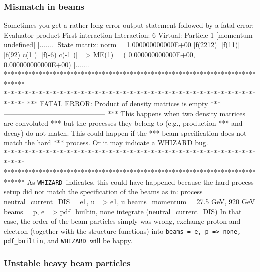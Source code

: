 \documentclass[12pt]{book}
\newenvironment{code}%
  {\begingroup\footnotesize
   \quote
   \Verbatim}%
  {\endVerbatim
   \endquote
   \endgroup\noindent}
\newenvironment{Code}%
  {\begingroup\footnotesize
   \quote
   \Verbatim[frame=single]}%
  {\endVerbatim
   \endquote
   \endgroup\noindent}
\newcommand{\ttt}[1]{\texttt{#1}}
\newcommand{\whizard}{\ttt{WHIZARD}}
\begin{document}
\subsubsection{Mismatch in beams}

Sometimes you get a rather long error output statement followed by a
fatal error:
\begin{Code}
 Evaluator product
 First interaction
 Interaction: 6
 Virtual:
 Particle 1
  [momentum undefined]
[.......]
 State matrix:  norm =  1.000000000000E+00
 [f(2212)]
   [f(11)]
     [f(92) c(1 )]
       [f(-6) c(-1 )] => ME(1) = ( 0.000000000000E+00, 0.000000000000E+00)
[.......]
******************************************************************************
******************************************************************************
*** FATAL ERROR: Product of density matrices is empty
***                 --------------------------------------------
***              This happens when two density matrices are convoluted
***              but the processes they belong to (e.g., production
***              and decay) do not match. This could happen if the
***              beam specification does not match the hard
***              process. Or it may indicate a WHIZARD bug.
******************************************************************************
******************************************************************************
\end{Code}
As \whizard\ indicates, this could have happened because the hard
process setup did not match the specification of the beams as in:
\begin{code}
process neutral_current_DIS = e1, u => e1, u
beams_momentum = 27.5 GeV, 920 GeV
beams = p, e => pdf_builtin, none
integrate (neutral_current_DIS)
\end{code}
In that case, the order of the beam particles simply was wrong,
exchange proton and electron (together with the structure functions)
into \ttt{beams = e, p => none, pdf\_builtin}, and \whizard\ will be
happy.

\subsubsection{Unstable heavy beam particles}
\end{document}
